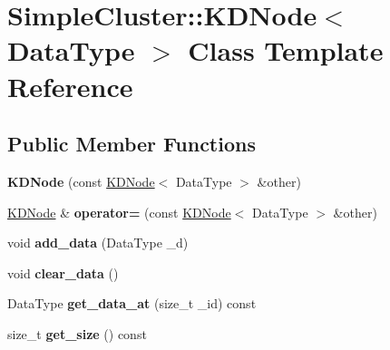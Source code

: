 \hypertarget{classSimpleCluster_1_1KDNode}{\section{Simple\-Cluster\-:\-:K\-D\-Node$<$ Data\-Type $>$ Class Template Reference}
\label{classSimpleCluster_1_1KDNode}
}
\subsection*{Public Member Functions}
\begin{DoxyCompactItemize}
\item 
\hypertarget{classSimpleCluster_1_1KDNode_a1722141bf4dab3bb456e0a119c61f4eb}{{\bfseries K\-D\-Node} (const \hyperlink{classSimpleCluster_1_1KDNode}{K\-D\-Node}$<$ Data\-Type $>$ \&other)}\label{classSimpleCluster_1_1KDNode_a1722141bf4dab3bb456e0a119c61f4eb}

\item 
\hypertarget{classSimpleCluster_1_1KDNode_a7719d6922448ee1c3c4f777117ce48a0}{\hyperlink{classSimpleCluster_1_1KDNode}{K\-D\-Node} \& {\bfseries operator=} (const \hyperlink{classSimpleCluster_1_1KDNode}{K\-D\-Node}$<$ Data\-Type $>$ \&other)}\label{classSimpleCluster_1_1KDNode_a7719d6922448ee1c3c4f777117ce48a0}

\item 
\hypertarget{classSimpleCluster_1_1KDNode_ab5ab826e385427c782eca75bb579df31}{void {\bfseries add\-\_\-data} (Data\-Type \-\_\-d)}\label{classSimpleCluster_1_1KDNode_ab5ab826e385427c782eca75bb579df31}

\item 
\hypertarget{classSimpleCluster_1_1KDNode_af8cb50f3b2e976537667ed84984b4a84}{void {\bfseries clear\-\_\-data} ()}\label{classSimpleCluster_1_1KDNode_af8cb50f3b2e976537667ed84984b4a84}

\item 
\hypertarget{classSimpleCluster_1_1KDNode_ac18f6502b432eb3dbb4c3e044a337eb4}{Data\-Type {\bfseries get\-\_\-data\-\_\-at} (size\-\_\-t \-\_\-id) const }\label{classSimpleCluster_1_1KDNode_ac18f6502b432eb3dbb4c3e044a337eb4}

\item 
\hypertarget{classSimpleCluster_1_1KDNode_ab06c42728e2c9eaaae39efcf7a70b736}{size\-\_\-t {\bfseries get\-\_\-size} () const }\label{classSimpleCluster_1_1KDNode_ab06c42728e2c9eaaae39efcf7a70b736}

\end{DoxyCompactItemize}
